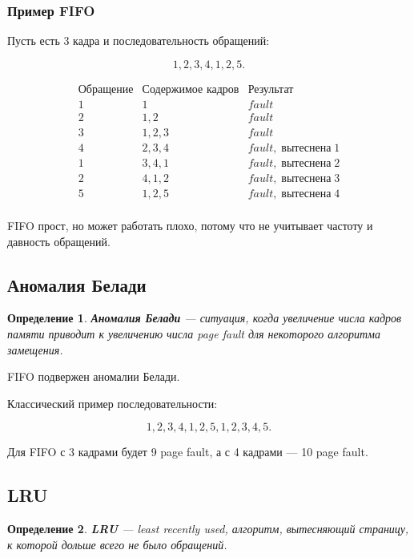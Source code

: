 \documentclass[a4paper,12pt]{article}
\newtheorem{definition}{Определение}
\begin{document}
\subsubsection{Пример FIFO}

Пусть есть 3 кадра и последовательность обращений:

\[
1,2,3,4,1,2,5.
\]

\[
\begin{array}{c|c|c}
\text{Обращение} & \text{Содержимое кадров} & \text{Результат} \\
\hline
1 & 1 & fault \\
2 & 1,2 & fault \\
3 & 1,2,3 & fault \\
4 & 2,3,4 & fault,\; вытеснена\;1 \\
1 & 3,4,1 & fault,\; вытеснена\;2 \\
2 & 4,1,2 & fault,\; вытеснена\;3 \\
5 & 1,2,5 & fault,\; вытеснена\;4 \\
\end{array}
\]

FIFO прост, но может работать плохо, потому что не учитывает частоту и давность обращений.

\subsection{Аномалия Белади}

\begin{definition}
\textbf{Аномалия Белади} --- ситуация, когда увеличение числа кадров памяти приводит к увеличению числа page fault для некоторого алгоритма замещения.
\end{definition}

FIFO подвержен аномалии Белади.

Классический пример последовательности:

\[
1,2,3,4,1,2,5,1,2,3,4,5.
\]

Для FIFO с 3 кадрами будет 9 page fault, а с 4 кадрами --- 10 page fault.

\subsection{LRU}

\begin{definition}
\textbf{LRU} --- least recently used, алгоритм, вытесняющий страницу, к которой дольше всего не было обращений.
\end{definition}
\end{document}
